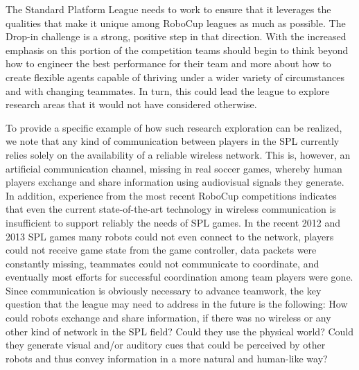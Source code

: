 \documentclass{llncs}
\begin{document}
The Standard Platform League 
needs to work to ensure that it leverages the qualities that make it unique among RoboCup leagues as much
as possible. The Drop-in challenge is a strong, positive step in that direction. With the
increased emphasis on this portion of the competition teams should begin to think beyond
how to engineer the best performance for their team and more about how to create flexible
agents capable of thriving under a wider variety of circumstances and with changing
teammates. In turn, this could lead the league to explore research areas that it would not have considered
otherwise. 

To provide a specific example of how such research exploration can be realized, we note that 
any kind of communication between players in the SPL currently relies solely on the 
availability of a reliable wireless network. This is, however, an artificial communication 
channel, missing in real soccer games, whereby human players exchange and share information 
using audiovisual signals they generate. 
In addition, experience from the most recent RoboCup competitions indicates that even the 
current state-of-the-art technology in wireless communication is insufficient to support 
reliably the needs of SPL games. In the recent 2012 and 2013 SPL games many robots could not 
even connect to the network, players could not receive game state from the game controller, 
data packets were constantly missing, teammates could not communicate to coordinate, and 
eventually most efforts for successful coordination among team players were gone. Since 
communication is obviously necessary to advance teamwork, the key question that the league 
may need to address in the future is the following: How could robots exchange and share 
information, if there was no wireless or any other kind of network in the SPL field? Could 
they use the physical world? Could they generate visual and/or auditory cues that could be 
perceived by other robots and thus convey information in a more natural and human-like way? 
\end{document}
